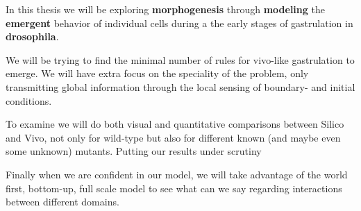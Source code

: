 In this thesis we will be exploring \textbf{morphogenesis} through \textbf{modeling} the \textbf{emergent} behavior of individual cells during a the early stages of  gastrulation in \textbf{drosophila}.

We will be trying to find the minimal number of rules for vivo-like gastrulation to emerge. We will have extra focus on the speciality of the problem, only transmitting global information through the local sensing of boundary- and initial conditions.

To examine we will do both visual and quantitative comparisons between Silico and Vivo, not only for wild-type but also for different known (and maybe even some unknown) mutants. Putting our results under scrutiny 

Finally when we are confident in our model, we will take advantage of the world first, bottom-up, full scale model to see what can we say regarding interactions between different domains.\\






